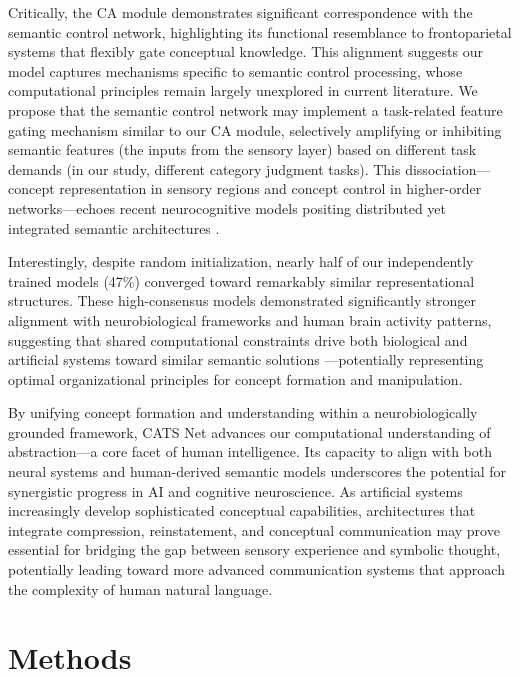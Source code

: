 \documentclass[pdflatex,sn-mathphys-num,lineno]{sn-jnl}%
\begin{document}
\begin{CJK}{UTF8}{gbsn}
Critically, the CA module demonstrates significant correspondence with the semantic control network, highlighting its functional resemblance to frontoparietal systems that flexibly gate conceptual knowledge. This alignment suggests our model captures mechanisms specific to semantic control processing, whose computational principles remain largely unexplored in current literature. We propose that the semantic control network may implement a task-related feature gating mechanism similar to our CA module, selectively amplifying or inhibiting semantic features (the inputs from the sensory layer) based on different task demands (in our study, different category judgment tasks). This dissociation—concept representation in sensory regions and concept control in higher-order networks—echoes recent neurocognitive models positing distributed yet integrated semantic architectures \cite{ralph_neural_2017}. 

Interestingly, despite random initialization, nearly half of our independently trained models (47\%) converged toward remarkably similar representational structures. These high-consensus models demonstrated significantly stronger alignment with neurobiological frameworks and human brain activity patterns, suggesting that shared computational constraints drive both biological and artificial systems toward similar semantic solutions \cite{carandini_normalization_2012}—potentially representing optimal organizational principles for concept formation and manipulation.

By unifying concept formation and understanding within a neurobiologically grounded framework, CATS Net advances our computational understanding of abstraction—a core facet of human intelligence. Its capacity to align with both neural systems and human-derived semantic models underscores the potential for synergistic progress in AI and cognitive neuroscience. As artificial systems increasingly develop sophisticated conceptual capabilities, architectures that integrate compression, reinstatement, and conceptual communication may prove essential for bridging the gap between sensory experience and symbolic thought, potentially leading toward more advanced communication systems that approach the complexity of human natural language.


\section{Methods}

\end{CJK}
\end{document}
